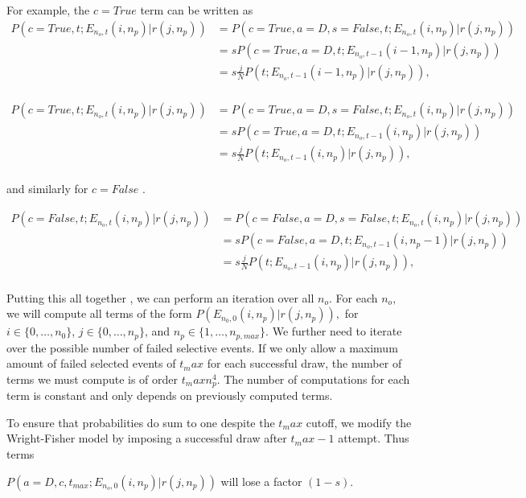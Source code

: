 \documentclass[review]{elsarticle}
\newcommand{\sgcomment}[1]{{\color{red}{SG: #1}}}
\begin{document}
For example, the $c = True$ term can be written as 
 \begin{equation}
\begin{split}
P(c=True, t;  E_{n_o,t}(i,n_p) | r(j, n_p)) &= P(c=True, a=D, s=False, t;  E_{n_o,t}(i,n_p) | r(j, n_p))\\
&= s P(c=True, a=D, t;  E_{n_o,t-1}(i-1,n_p) | r(j, n_p))\\
&= s \frac{j}{N} P( t;  E_{n_o,t-1}(i-1,n_p) | r(j, n_p)),\\
\end{split}
\end{equation}

\sgcomment{I think this might want to be: }
 \begin{equation}
\begin{split}
P(c=True, t;  E_{n_o,t}(i,n_p) | r(j, n_p)) &= P(c=True, a=D, s=False, t;  E_{n_o,t}(i,n_p) | r(j, n_p))\\
&= s P(c=True, a=D, t;  E_{n_o,t-1}(i,n_p) | r(j, n_p))\\
&= s \frac{j}{N} P( t;  E_{n_o,t-1}(i,n_p) | r(j, n_p)),\\
\end{split}
\end{equation}

and similarly for $c=False$ \sgcomment{Write out? TODO, not complete}.  

 \begin{equation}
\begin{split}
P(c=False, t;  E_{n_o,t}(i,n_p) | r(j, n_p)) &= P(c=False, a=D, s=False, t;  E_{n_o,t}(i,n_p) | r(j, n_p))\\
&= s P(c=False, a=D, t;  E_{n_o,t-1}(i,n_p-1) | r(j, n_p))\\
&= s \frac{j}{N} P( t;  E_{n_o,t-1}(i,n_p) | r(j, n_p)),\\
\end{split}
\end{equation}


Putting this all together \sgcomment{pseudocode?}, we can perform an iteration over all $n_o.$ For
each $n_o,$ we will compute all terms of the form $P(E_{n_0,0}(i,n_p) | r(j, n_p)),$ for
$i\in\{0,\ldots,n_0\}$, $j\in \{0,\ldots,n_p\}$, and $n_p \in\{1,\ldots,n_{p,max}\}.$ We further
need to iterate over the possible number of failed selective events. If we only allow a maximum
amount of failed selected events of $t_max$ for each successful draw, the number of terms we must
compute is of order $t_max n_p^4$. The number of computations for each term is constant and only
depends on previously computed terms.

To ensure that probabilities do sum to one despite the $t_max$ cutoff, we modify the Wright-Fisher model by imposing a successful draw after $t_max-1$ attempt. Thus terms

$P(a=D,c,t_{max}; E_{n_o,0}(i,n_p)  | r(j, n_p))$ will lose a factor $(1-s)$.   
\end{document}
